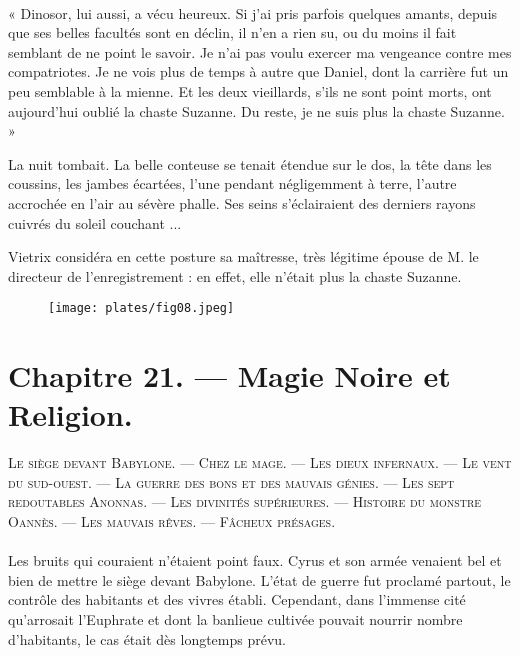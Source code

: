 \documentclass[a4paper, 11pt, oneside, polutonikogreek, french]{article}
\begin{document}
\paragraph{}
« Dinosor, lui aussi, a vécu heureux. Si j'ai pris parfois quelques amants, depuis que ses belles facultés sont en déclin, il n'en a rien su, ou du moins il fait semblant de ne point le savoir. Je n'ai pas voulu exercer ma vengeance contre mes compatriotes. Je ne vois plus de temps à autre que Daniel, dont la carrière fut un peu semblable à la mienne. Et les deux vieillards, s'ils ne sont point morts, ont aujourd'hui oublié la chaste Suzanne. Du reste, je ne suis plus la chaste Suzanne. »

\bigskip
\centerline{\EightStarTaper}
\centerline{\EightStarTaper\EightStarTaper}
\bigskip

La nuit tombait. La belle conteuse se tenait étendue sur le dos, la tête dans les coussins, les jambes écartées, l'une pendant négligemment à terre, l'autre accrochée en l'air au sévère phalle. Ses seins s'éclairaient des derniers rayons cuivrés du soleil couchant ...

Vietrix considéra en cette posture sa maîtresse, très légitime épouse de M. le directeur de l'enregistrement : en effet, elle n'était plus la chaste Suzanne.
\clearpage
\begin{figure}[H]
\centering
\texttt{[image: plates/fig08.jpeg]}
\end{figure}
\section{Chapitre 21. --- Magie Noire et Religion.}
\begin{center}
\scshape
\small
Le siège devant Babylone. --- Chez le mage. --- Les dieux infernaux. --- Le vent du sud-ouest. --- La guerre des bons et des mauvais génies. --- Les sept redoutables Anonnas. --- Les divinités supérieures. --- Histoire du monstre Oannès. --- Les mauvais rêves. --- Fâcheux présages.
\end{center}
\paragraph{}
Les bruits qui couraient n'étaient point faux. Cyrus et son armée venaient bel et bien de mettre le siège devant Babylone. L'état de guerre fut proclamé partout, le contrôle des habitants et des vivres établi. Cependant, dans l'immense cité qu'arrosait l'Euphrate et dont la banlieue cultivée pouvait nourrir nombre d'habitants, le cas était dès longtemps prévu.
\end{document}
